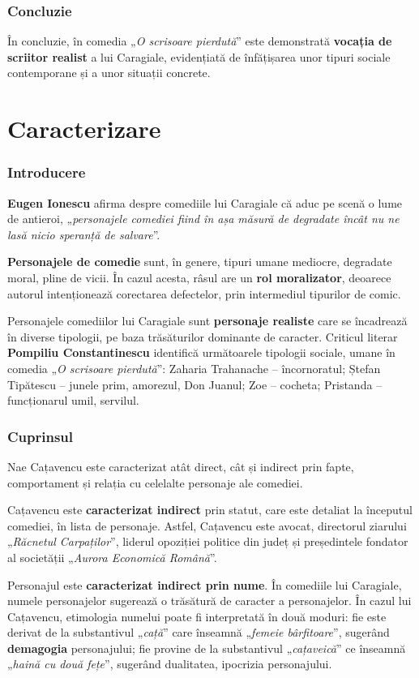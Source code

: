 \documentclass{article}
\newcommand{\qu}[1]{„\emph{#1}”}
\begin{document}
\section{Concluzie}
În concluzie, în comedia \qu{O scrisoare pierdută} este demonstrată \textbf{vocația de scriitor realist} a lui Caragiale, evidențiată de înfățișarea unor tipuri sociale contemporane și a unor situații concrete.

\part*{Caracterizare}
\setcounter{section}{0}
\section{Introducere}
\textbf{Eugen Ionescu} afirma despre comediile lui Caragiale că aduc pe scenă o lume de antieroi, \qu{personajele comediei fiind în așa măsură de degradate încât nu ne lasă nicio speranță de salvare}.

\textbf{Personajele de comedie} sunt, în genere, tipuri umane mediocre, degradate moral, pline de vicii. În cazul acesta, râsul are un \textbf{rol moralizator}, deoarece autorul intenționează corectarea defectelor, prin intermediul tipurilor de comic.

Personajele comediilor lui Caragiale sunt \textbf{personaje realiste} care se încadrează în diverse tipologii, pe baza trăsăturilor dominante de caracter. Criticul literar \textbf{Pompiliu Constantinescu} identifică următoarele tipologii sociale, umane în comedia \qu{O scrisoare pierdută}: Zaharia Trahanache -- încornoratul; Ștefan Tipătescu -- junele prim, amorezul, Don Juanul; Zoe -- cocheta; Pristanda -- funcționarul umil, servilul.
\section{Cuprinsul}
Nae Cațavencu este caracterizat atât direct, cât și indirect prin fapte, comportament și relația cu celelalte personaje ale comediei.

Cațavencu este \textbf{caracterizat indirect} prin statut, care este detaliat la începutul comediei, în lista de personaje. Astfel, Cațavencu este avocat, directorul ziarului \qu{Răcnetul Carpaților}, liderul opoziției politice din județ și președintele fondator al societății \qu{Aurora Economică Română}.

Personajul este \textbf{caracterizat indirect prin nume}. În comediile lui Caragiale, numele personajelor sugerează o trăsătură de caracter a personajelor. În cazul lui Cațavencu, etimologia numelui poate fi interpretată în două moduri: fie este derivat de la substantivul \qu{cață} care înseamnă \qu{femeie bârfitoare}, sugerând \textbf{demagogia} personajului; fie provine de la substantivul \qu{cațaveică} ce înseamnă \qu{haină cu două fețe}, sugerând dualitatea, ipocrizia personajului.
\end{document}
